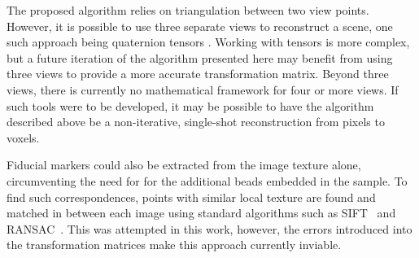 \documentclass[times, twoside, watermark]{zHenriquesLab-StyleBioRxiv}
\begin{document}
The proposed algorithm relies on triangulation between two view points.
However, it is possible to use three separate views %
to reconstruct a scene, one such approach being quaternion tensors \cite{?}.
Working with tensors is more complex, but a future iteration of the algorithm presented here may benefit from using three views to provide a more accurate transformation matrix.
Beyond three views, there is currently no mathematical framework for four or more views.
If such tools were to be developed, it may be possible to have the algorithm described above be a non-iterative, single-shot reconstruction from pixels to voxels.

Fiducial markers could also be extracted from the image texture alone, circumventing the need for for the additional beads embedded in the sample.
To find such correspondences, points with similar local texture are found and matched in between each image using standard algorithms such as SIFT~\cite{?} and RANSAC~\cite{?}. %
This was attempted in this work, however, the errors introduced into the transformation matrices make this approach currently inviable.
\pagebreak
%
%
%
%
%
\end{document}
